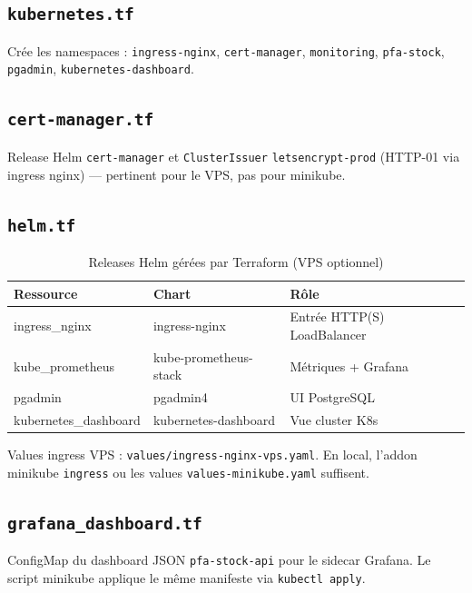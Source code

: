 \subsection{\texttt{kubernetes.tf}}

Crée les namespaces : \texttt{ingress-nginx}, \texttt{cert-manager}, \texttt{monitoring}, \texttt{pfa-stock}, \texttt{pgadmin}, \texttt{kubernetes-dashboard}.

\subsection{\texttt{cert-manager.tf}}

Release Helm \texttt{cert-manager} et \texttt{ClusterIssuer} \texttt{letsencrypt-prod} (HTTP-01 via ingress nginx) — pertinent pour le VPS, pas pour minikube.

\subsection{\texttt{helm.tf}}

\begin{table}[htbp]
  \centering
  \caption{Releases Helm gérées par Terraform (VPS optionnel)}
  \label{tab:helm-tf}
  \begin{tabular}{@{}lll@{}}
    \toprule
    \textbf{Ressource} & \textbf{Chart} & \textbf{Rôle} \\
    \midrule
    ingress\_nginx & ingress-nginx & Entrée HTTP(S) LoadBalancer \\
    kube\_prometheus & kube-prometheus-stack & Métriques + Grafana \\
    pgadmin & pgadmin4 & UI PostgreSQL \\
    kubernetes\_dashboard & kubernetes-dashboard & Vue cluster K8s \\
    \bottomrule
  \end{tabular}
\end{table}

Values ingress VPS : \texttt{values/ingress-nginx-vps.yaml}. En local, l'addon minikube \texttt{ingress} ou les values \texttt{values-minikube.yaml} suffisent.

\subsection{\texttt{grafana\_dashboard.tf}}

ConfigMap du dashboard JSON \texttt{pfa-stock-api} pour le sidecar Grafana. Le script minikube applique le même manifeste via \texttt{kubectl apply}.

